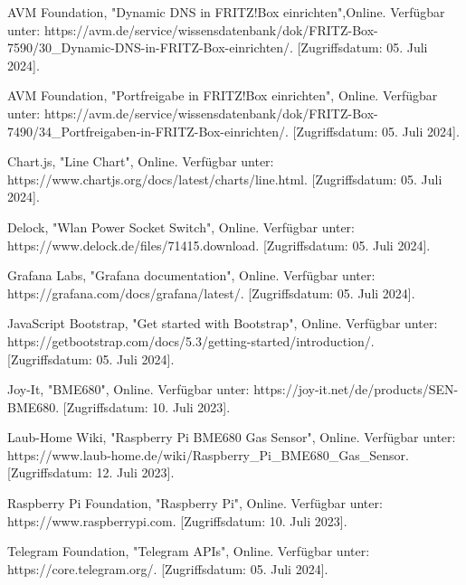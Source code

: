 \documentclass[conference]{IEEEtran}
\begin{document}
\begin{thebibliography}{00}
AVM Foundation, "Dynamic DNS in FRITZ!Box einrichten",Online. Verfügbar unter: https://avm.de/service/wissensdatenbank/dok/FRITZ-Box-7590/30\_Dynamic-DNS-in-FRITZ-Box-einrichten/. [Zugriffsdatum: 05. Juli 2024].

AVM Foundation, "Portfreigabe in FRITZ!Box einrichten", Online. Verfügbar unter: https://avm.de/service/wissensdatenbank/dok/FRITZ-Box-7490/34\_Portfreigaben-in-FRITZ-Box-einrichten/. [Zugriffsdatum: 05. Juli 2024].

Chart.js, "Line Chart", Online. Verfügbar unter: https://www.chartjs.org/docs/latest/charts/line.html. [Zugriffsdatum: 05. Juli 2024].

Delock, "Wlan Power Socket Switch", Online. Verfügbar unter: https://www.delock.de/files/71415.download. [Zugriffsdatum: 05. Juli 2024].

Grafana Labs, "Grafana documentation", Online. Verfügbar unter: https://grafana.com/docs/grafana/latest/. [Zugriffsdatum: 05. Juli 2024].

JavaScript Bootstrap, "Get started with Bootstrap", Online. Verfügbar unter: https://getbootstrap.com/docs/5.3/getting-started/introduction/. [Zugriffsdatum: 05. Juli 2024].

Joy-It, "BME680", Online. Verfügbar unter: https://joy-it.net/de/products/SEN-BME680. [Zugriffsdatum: 10. Juli 2023].

Laub-Home Wiki, "Raspberry Pi BME680 Gas Sensor", Online. Verfügbar unter: https://www.laub-home.de/wiki/Raspberry\_Pi\_BME680\_Gas\_Sensor. [Zugriffsdatum: 12. Juli 2023].

Raspberry Pi Foundation, "Raspberry Pi", Online. Verfügbar unter: https://www.raspberrypi.com. [Zugriffsdatum: 10. Juli 2023].

Telegram Foundation, "Telegram APIs", Online. Verfügbar unter: https://core.telegram.org/. [Zugriffsdatum: 05. Juli 2024].
\end{thebibliography}
\end{document}
